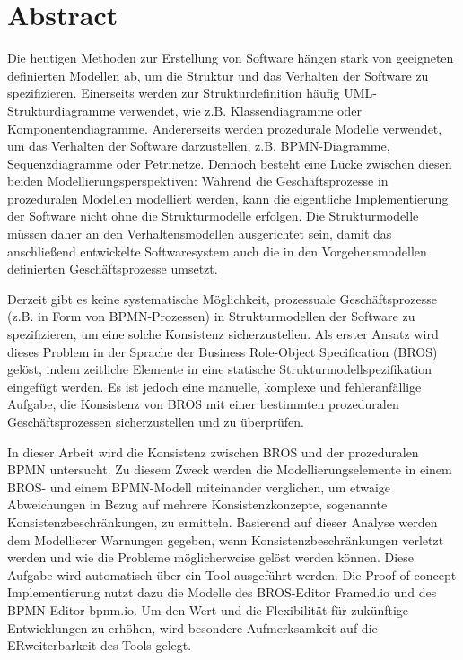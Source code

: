 \chapter*{Abstract}

Die heutigen Methoden zur Erstellung von Software hängen stark von geeigneten definierten Modellen ab, um die Struktur und das Verhalten der Software zu spezifizieren.
Einerseits werden zur Strukturdefinition häufig UML-Strukturdiagramme verwendet, wie z.B. Klassendiagramme oder Komponentendiagramme.
Andererseits werden prozedurale Modelle verwendet, um das Verhalten der Software darzustellen, z.B. BPMN-Diagramme, Sequenzdiagramme oder Petrinetze.
Dennoch besteht eine Lücke zwischen diesen beiden Modellierungsperspektiven: Während die Geschäftsprozesse in prozeduralen Modellen modelliert werden, kann die eigentliche Implementierung der Software nicht ohne die Strukturmodelle erfolgen.
Die Strukturmodelle müssen daher an den Verhaltensmodellen ausgerichtet sein, damit das anschließend entwickelte Softwaresystem auch die in den Vorgehensmodellen definierten Geschäftsprozesse umsetzt.

Derzeit gibt es keine systematische Möglichkeit, prozessuale Geschäftsprozesse (z.B. in Form von BPMN-Prozessen) in Strukturmodellen der Software zu spezifizieren, um eine solche Konsistenz sicherzustellen.
Als erster Ansatz wird dieses Problem in der Sprache der Business Role-Object Specification (BROS) gelöst, indem zeitliche Elemente in eine statische Strukturmodellspezifikation eingefügt werden.
Es ist jedoch eine manuelle, komplexe und fehleranfällige Aufgabe, die Konsistenz von BROS mit einer bestimmten prozeduralen Geschäftsprozessen sicherzustellen und zu überprüfen.

In dieser Arbeit wird die Konsistenz zwischen BROS und der prozeduralen BPMN untersucht.
Zu diesem Zweck werden die Modellierungselemente in einem BROS- und einem BPMN-Modell miteinander verglichen, um etwaige Abweichungen in Bezug auf mehrere Konsistenzkonzepte, sogenannte Konsistenzbeschränkungen, zu ermitteln.
Basierend auf dieser Analyse werden dem Modellierer Warnungen gegeben, wenn Konsistenzbeschränkungen verletzt werden und wie die Probleme möglicherweise gelöst werden können.
Diese Aufgabe wird automatisch über ein Tool ausgeführt werden. Die Proof-of-concept Implementierung nutzt dazu die Modelle des BROS-Editor Framed.io und des BPMN-Editor bpnm.io.
Um den Wert und die Flexibilität für zukünftige Entwicklungen zu erhöhen, wird besondere Aufmerksamkeit auf die ERweiterbarkeit des Tools gelegt.
